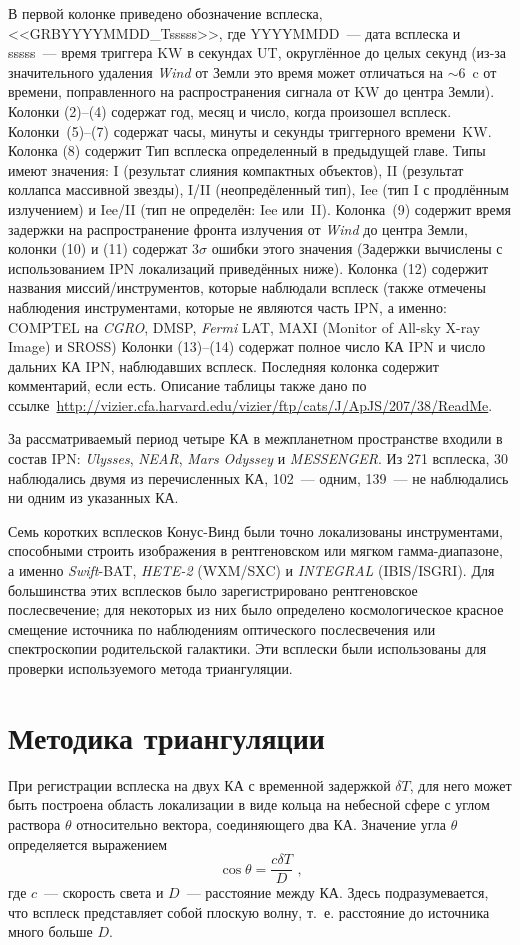 В первой колонке приведено обозначение всплеска, <<GRBYYYYMMDD\_Tsssss>>, 
где YYYYMMDD~--- дата всплеска и sssss~--- время триггера KW в секундах UT,
округлённое до целых секунд (из-за значительного удаления \textit{Wind} от Земли
это время может отличаться на $\sim 6$~c от времени, поправленного на распространения 
сигнала от KW до центра Земли). 
Колонки (2)--(4) содержат год, месяц и число, когда произошел всплеск. 
Колонки~(5)--(7) содержат часы, минуты и секунды триггерного времени~KW.
Колонка (8) содержит Тип всплеска определенный в предыдущей главе. 
Типы имеют значения: I (результат слияния компактных объектов), 
II (результат коллапса массивной звезды), I/II (неопредёленный тип), Iee (тип I с продлённым излучением)
и Iee/II (тип не определён: Iee или~II). Колонка~(9) содержит время задержки на распространение
фронта излучения от  \textit{Wind} до центра Земли, колонки (10) и (11) содержат
$3\sigma$ ошибки этого значения (Задержки вычислены с использованием IPN локализаций приведённых ниже). 
Колонка (12) содержит названия миссий/инструментов, которые наблюдали всплеск
(также отмечены наблюдения инструментами, которые не являются часть IPN, а именно:
COMPTEL на \textit{CGRO}, DMSP, \textit{Fermi} LAT, MAXI (Monitor of All-sky X-ray Image) и SROSS)
Колонки (13)--(14) содержат полное число КА IPN и число дальних КА IPN, наблюдавших всплеск.
Последняя колонка содержит комментарий, если есть. Описание таблицы также дано 
по ссылке~\url{http://vizier.cfa.harvard.edu/vizier/ftp/cats/J/ApJS/207/38/ReadMe}.

За рассматриваемый период четыре КА в межпланетном пространстве входили в состав IPN: 
\textit{Ulysses}, \textit{NEAR}, \textit{Mars Odyssey} и \textit{MESSENGER}. 
Из 271 всплеска, 30 наблюдались двумя из перечисленных КА, 102~--- одним, 
139~--- не наблюдались ни одним из указанных КА.

Семь коротких всплесков Конус-Винд были точно локализованы инструментами, 
способными строить изображения в рентгеновском или мягком гамма-диапазоне, 
а именно \textit{Swift}-BAT, \textit{HETE-2} (WXM/SXC) и \textit{INTEGRAL} (IBIS/ISGRI). 
Для большинства этих всплесков было зарегистрировано рентгеновское послесвечение; 
для некоторых из них было определено космологическое красное смещение источника 
по наблюдениям оптического послесвечения или спектроскопии родительской галактики. 
Эти всплески были использованы для проверки используемого метода триангуляции.
\FloatBarrier
\section{Методика триангуляции}
При регистрации всплеска на двух КА с временной задержкой $\delta T$, для него 
может быть построена область локализации в виде кольца на небесной сфере с углом 
раствора $\theta$ относительно вектора, соединяющего два КА. Значение угла $\theta$ определяется выражением
\begin{equation}
\cos \theta = \frac{c \delta T}{D} \mbox{ ,}
\end{equation}
где $c$~--- скорость света и $D$~--- расстояние между КА. Здесь подразумевается, 
что всплеск представляет собой плоскую волну, т.~е. расстояние до источника много больше $D$.


